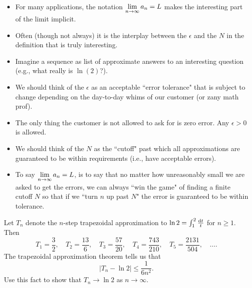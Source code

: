 \begin{remark}\,
\begin{itemize}
\item For many applications, the notation $\displaystyle\lim_{n\to\infty} a_n= L$ makes the interesting part of the limit implicit.
\item Often (though not always) it is the interplay between the $\epsilon$ and the $N$ in the definition that is truly interesting.
\item Imagine a sequence as list of approximate answers to an interesting question (e.g., what really is $\ln(2)$?).
\item We should think of the $\epsilon$ as an acceptable ``error tolerance" that is subject to change depending on the day-to-day whims of our customer (or zany math prof).
\item The only thing the customer is not allowed to ask for is zero error.  Any $\epsilon>0$ is allowed.
\item We should think of the $N$ as the ``cutoff" past which all approximations are guaranteed to be within requirements (i.e., have acceptable errors).
\item To say $\displaystyle\lim_{n\to\infty} a_n= L$, is to say that no matter how unreasonably small we are asked to get the errors, we can always ``win the game" of finding a finite cutoff $N$ so that if we ``turn $n$ up past $N$" the error is guaranteed to be within tolerance.
\end{itemize}
\end{remark}

\newpage

\begin{example}
Let $T_n$ denote the $n$-step trapezoidal approximation to $\ln 2 = \int_1^2\frac{\mathrm{d} t}{t}$ for $n\ge 1$.
Then
\begin{equation*}
T_1 = \frac{3}{2},\quad
T_2 = \frac{13}{6},\quad
T_3 =\frac{57}{20},\quad
T_4=\frac{743}{210},\quad
T_5 = \frac{2131}{504},\quad \dots.
\end{equation*}
The trapezoidal approximation theorem tells us that
\begin{equation*}
\left| T_n - \ln 2\right| \le \frac{1}{6n^2}.
\end{equation*}
Use this fact to show that $T_n\to \ln 2$ as $n\to\infty$.
\end{example}

\newpage

